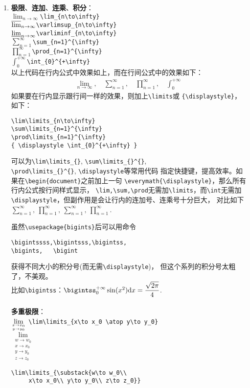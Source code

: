 \documentclass[fontset=windows]{article}
\newcommand{\q}{\quad}
\begin{document}
\begin{multicols}{2}
\begin{enumerate}
\item \textbf{极限}、\textbf{连加}、\textbf{连乘}、\textbf{积分}：\\
$ \lim_{n\to\infty} $\q \verb|\lim_{n\to\infty}| \\
$ \varlimsup_{n\to\infty} $\q \verb|\varlimsup_{n\to\infty}| \\
$ \varliminf_{n\to\infty} $\q \verb|\varliminf_{n\to\infty}| \\
$ \sum_{n=1}^{\infty} $\q\q \verb|\sum_{n=1}^{\infty}| \\
$ \prod_{n=1}^{\infty} $\q\q \verb|\prod_{n=1}^{\infty}| \\
$ \int_{0}^{+\infty} $\q\q\q \verb|\int_{0}^{+\infty}| \\
以上代码在行内公式中效果如上，而在行间公式中的效果如下：
\begin{gather*}
    \lim_{n\to\infty},\q \sum_{n=1}^{\infty},\q 
    \prod_{n=1}^{\infty},\q \int_{0}^{+\infty}
\end{gather*}
如果要在行内显示跟行间一样的效果，则加上\verb|\limits|或
\verb|{\displaystyle}|，如下：
\begin{lstlisting}
\lim\limits_{n\to\infty}
\sum\limits_{n=1}^{\infty}
\prod\limits_{n=1}^{\infty}
{ \displaystyle \int_{0}^{+\infty} }
\end{lstlisting} 
可以为\verb|\lim\limits_{}|, \verb|\sum\limits_{}^{}|,\\
\verb|\prod\limits_{}^{}|, \verb|\displaystyle|等常用代码
指定快捷键，提高效率。如果在\verb|\begin{document}|之前加上一句
\verb|\everymath{\displaystyle}|，那么所有行内公式按行间样式显示，
\verb|\lim,\sum,\prod|无需加\verb|\limits|，而\verb|\int|无需加
\verb|\displaystyle|，但副作用是会让行内的连加号、连乘号十分巨大，
对比如下$ \sum\limits_{n=1}^{\infty},\ 
\prod\limits_{n=1}^{\infty},\ { \displaystyle 
\sum_{n=1}^{\infty},\ \prod_{n=1}^{\infty} } $.

虽然\verb|\usepackage{bigints}|后可以用命令
\begin{lstlisting}
\bigintssss,\bigintsss,\bigintss,
\bigints,   \bigint    
\end{lstlisting} 
获得不同大小的积分号(而无需\verb|\displaystyle|)，
但这个系列的积分号太粗了，不美观。\\
比如\verb|\bigintss|：$ \bigintss_{0}^{+\infty} \sin(x^2)
\mathrm{d}x =\dfrac{\sqrt{2\pi}}{4} $.\\
\\
\textbf{多重极限}：\\
$ \lim\limits_{x\to x_0 \atop y\to y_0} $\q 
\verb|\lim\limits_{x\to x_0 \atop y\to y_0}| \\
$ \lim\limits_{\substack{w\to w_0\\ x\to x_0\\ y\to y_0\\ z\to z_0}} $  
\begin{lstlisting}
\lim\limits_{\substack{w\to w_0\\ 
     x\to x_0\\ y\to y_0\\ z\to z_0}}    
\end{lstlisting} 


\end{enumerate}
\end{multicols}
\end{document}

